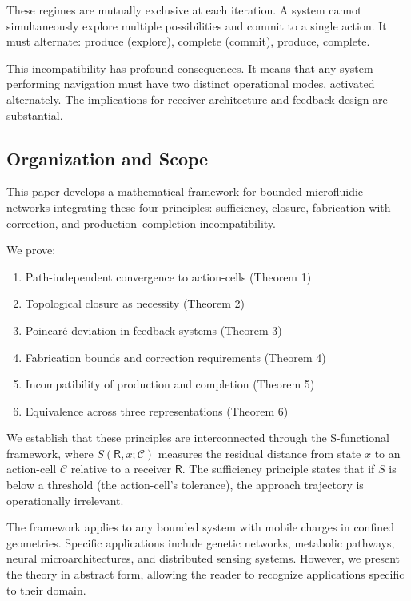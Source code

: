\documentclass[twocolumn,11pt,a4paper]{article}
\newcommand{\Cell}{\mathcal{C}}
\newcommand{\receiver}{\mathsf{R}}
\begin{document}
These regimes are mutually exclusive at each iteration. A system cannot simultaneously explore multiple possibilities and commit to a single action. It must alternate: produce (explore), complete (commit), produce, complete.

This incompatibility has profound consequences. It means that any system performing navigation must have two distinct operational modes, activated alternately. The implications for receiver architecture and feedback design are substantial.



\subsection{Organization and Scope}

This paper develops a mathematical framework for bounded microfluidic networks integrating these four principles: sufficiency, closure, fabrication-with-correction, and production--completion incompatibility.

We prove:
\begin{enumerate}[label=(\arabic*),leftmargin=*]
\item Path-independent convergence to action-cells (Theorem 1)
\item Topological closure as necessity (Theorem 2)
\item Poincar\'{e} deviation in feedback systems (Theorem 3)
\item Fabrication bounds and correction requirements (Theorem 4)
\item Incompatibility of production and completion (Theorem 5)
\item Equivalence across three representations (Theorem 6)
\end{enumerate}

We establish that these principles are interconnected through the S-functional framework, where $S(\receiver, x; \Cell)$ measures the residual distance from state $x$ to an action-cell $\Cell$ relative to a receiver $\receiver$. The sufficiency principle states that if $S$ is below a threshold (the action-cell's tolerance), the approach trajectory is operationally irrelevant.

The framework applies to any bounded system with mobile charges in confined geometries. Specific applications include genetic networks, metabolic pathways, neural microarchitectures, and distributed sensing systems. However, we present the theory in abstract form, allowing the reader to recognize applications specific to their domain.
\end{document}
